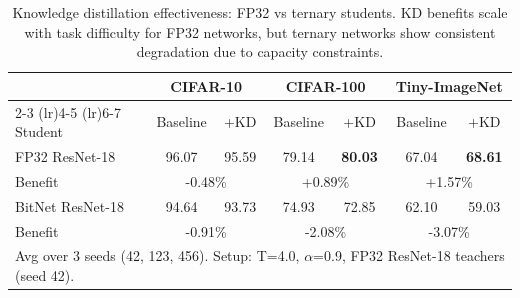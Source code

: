 \begin{table}[h]
\centering
\caption{Knowledge distillation effectiveness: FP32 vs ternary students.
KD benefits scale with task difficulty for FP32 networks, but ternary networks show consistent degradation due to capacity constraints.}
\label{tab:kd_results}
\begin{tabular}{lcccccc}
\toprule
& \multicolumn{2}{c}{CIFAR-10} & \multicolumn{2}{c}{CIFAR-100} & \multicolumn{2}{c}{Tiny-ImageNet} \\
\cmidrule(lr){2-3} \cmidrule(lr){4-5} \cmidrule(lr){6-7}
Student & Baseline & +KD & Baseline & +KD & Baseline & +KD \\
\midrule
FP32 ResNet-18 & 96.07 & 95.59 & 79.14 & \textbf{80.03} & 67.04 & \textbf{68.61} \\
Benefit & \multicolumn{2}{c}{\color{red}-0.48\%} & \multicolumn{2}{c}{+0.89\%} & \multicolumn{2}{c}{+1.57\%} \\
\midrule
BitNet ResNet-18 & 94.64 & 93.73 & 74.93 & 72.85 & 62.10 & 59.03 \\
Benefit & \multicolumn{2}{c}{\color{red}-0.91\%} & \multicolumn{2}{c}{\color{red}-2.08\%} & \multicolumn{2}{c}{\color{red}-3.07\%} \\
\bottomrule
\multicolumn{7}{l}{\footnotesize Avg over 3 seeds (42, 123, 456). Setup: T=4.0, $\alpha$=0.9, FP32 ResNet-18 teachers (seed 42).}
\end{tabular}
\end{table}
